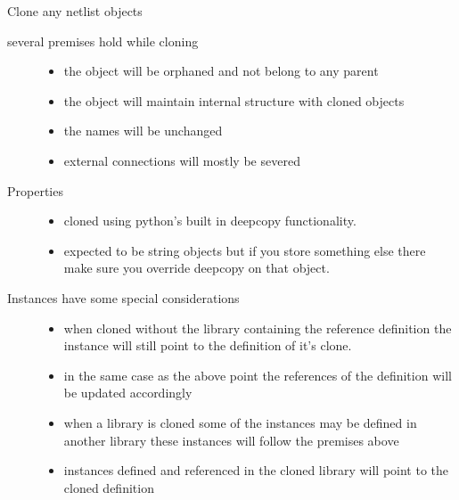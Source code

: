 \documentclass[letterpaper,10pt,english,openany,oneside]{sphinxmanual}
\begin{document}
\begin{fulllineitems}
\label{\detokenize{reference/classes/generated/spydrnet.clone.clone:spydrnet.clone.clone}}
Clone any netlist objects
\begin{description}
\item[{several premises hold while cloning}] \leavevmode\begin{itemize}
\item {} 
the object will be orphaned and not belong to any parent

\item {} 
the object will maintain internal structure with cloned objects

\item {} 
the names will be unchanged

\item {} 
external connections will mostly be severed

\end{itemize}

\item[{Properties}] \leavevmode\begin{itemize}
\item {} 
cloned using python’s built in deepcopy functionality.

\item {} 
expected to be string objects but if you store something else there make sure you override deepcopy on that object.

\end{itemize}

\item[{Instances have some special considerations}] \leavevmode\begin{itemize}
\item {} 
when cloned without the library containing the reference definition the instance will still point to the definition of it’s clone.

\item {} 
in the same case as the above point the references of the definition will be updated accordingly

\item {} 
when a library is cloned some of the instances may be defined in another library these instances will follow the premises above

\item {} 
instances defined and referenced in the cloned library will point to the cloned definition

\end{itemize}

\end{description}

\end{fulllineitems}
\end{document}
